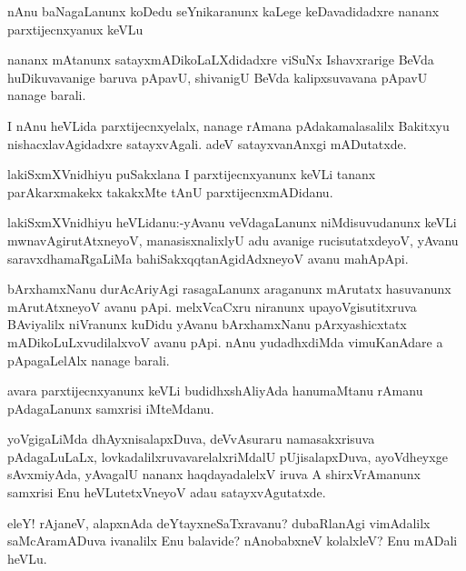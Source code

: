 \documentclass{article}
\begin{document}
\begin{mn}%
nAnu baNagaLanunx koDedu seYnikaranunx kaLege keDavadidadxre nananx parxtijecnxyanux keVLu
\end{mn}

\begin{mn}%
nananx mAtanunx satayxmADikoLaLXdidadxre viSuNx Ishavxrarige BeVda huDikuvavanige baruva 
pApavU, shivanigU BeVda kalipxsuvavana pApavU nanage barali.
\end{mn}

\begin{mn}%
I nAnu heVLida parxtijecnxyelalx, nanage rAmana pAdakamalasalilx Bakitxyu 
nishacxlavAgidadxre satayxvAgali. adeV satayxvanAnxgi mADutatxde.
\end{mn}

\begin{mn}%
lakiSxmXVnidhiyu puSakxlana I parxtijecnxyanunx keVLi tananx parAkarxmakekx takakxMte tAnU 
parxtijecnxmADidanu.
\end{mn}

\begin{mn}%
lakiSxmXVnidhiyu heVLidanu:-yAvanu veVdagaLanunx niMdisuvudanunx keVLi mwnavAgirutAtxneyoV,
manasisxnalixlyU adu avanige rucisutatxdeyoV, yAvanu saravxdhamaRgaLiMa 
bahiSakxqqtanAgidAdxneyoV avanu mahApApi.
\end{mn}

\begin{mn}%
bArxhamxNanu durAcAriyAgi rasagaLanunx araganunx mArutatx hasuvanunx mArutAtxneyoV avanu 
pApi. melxVcaCxru niranunx upayoVgisutitxruva BAviyalilx niVranunx kuDidu yAvanu 
bArxhamxNanu pArxyashicxtatx mADikoLuLxvudilalxvoV avanu pApi. nAnu yudadhxdiMda 
vimuKanAdare a pApagaLelAlx nanage barali.
\end{mn}

\begin{mn}%
avara parxtijecnxyanunx keVLi budidhxshAliyAda hanumaMtanu rAmanu pAdagaLanunx samxrisi 
iMteMdanu.
\end{mn}

\begin{mn}%
yoVgigaLiMda dhAyxnisalapxDuva, deVvAsuraru namasakxrisuva pAdagaLuLaLx, 
lovkadalilxruvavarelalxriMdalU pUjisalapxDuva, ayoVdheyxge sAvxmiyAda, yAvagalU nananx 
haqdayadalelxV iruva A shirxVrAmanunx samxrisi Enu heVLutetxVneyoV adau satayxvAgutatxde.
\end{mn}

\begin{mn}%
eleY! rAjaneV, alapxnAda deYtayxneSaTxravanu? dubaRlanAgi vimAdalilx saMcAramADuva ivanalilx 
Enu balavide? nAnobabxneV kolalxleV? Enu mADali heVLu.
\end{mn}
\end{document}
